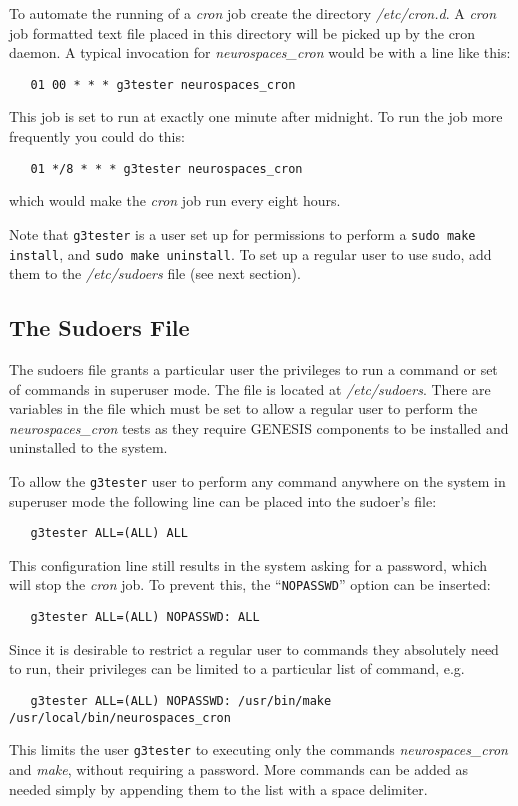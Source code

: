 \documentclass[12pt]{article}
\begin{document}
To automate the running of a {\it cron} job create the directory {\it /etc/cron.d}. A {\it cron} job formatted text file placed in this directory will be picked up by the cron daemon. A typical invocation for {\it neurospaces\_cron} would be with a line like this:
\begin{verbatim}
   01 00 * * * g3tester neurospaces_cron
\end{verbatim}
This job is set to run at exactly one minute after midnight. To run the job more frequently you could do this:
\begin{verbatim}
   01 */8 * * * g3tester neurospaces_cron
\end{verbatim}
which would make the {\it cron} job run every eight hours.

Note that {\tt g3tester} is a user set up for permissions to perform a {\tt sudo make install}, and {\tt sudo make uninstall}. To set up a regular user to use sudo, add them to the {\it /etc/sudoers} file (see next section).

\subsection*{The Sudoers File}

The sudoers file grants a particular user the privileges to run a command or set of commands in superuser mode. The file is located at {\it /etc/sudoers}. There are variables in the file which must be set to allow a regular user to perform the {\it neurospaces\_cron} tests as they require GENESIS components to be installed and uninstalled to the system.

To allow the {\tt g3tester} user to perform any command anywhere on the system in superuser mode the following line can be placed into the sudoer's file:
\begin{verbatim}
   g3tester ALL=(ALL) ALL
\end{verbatim}
This configuration line still results in the system asking for a password, which will stop the {\it cron} job. To prevent this, the ``{\tt NOPASSWD}'' option can be inserted:
\begin{verbatim}
   g3tester ALL=(ALL) NOPASSWD: ALL
\end{verbatim}
Since it is desirable to restrict a regular user to commands they absolutely need to run, their privileges can be limited to a particular list of command, e.g.
\begin{verbatim}
   g3tester ALL=(ALL) NOPASSWD: /usr/bin/make /usr/local/bin/neurospaces_cron
\end{verbatim}
This limits the user {\tt g3tester} to executing only the commands {\it neurospaces\_cron} and {\it make}, without requiring a password. More commands can be added as needed simply by appending them to the list with a space delimiter. 
\end{document}
